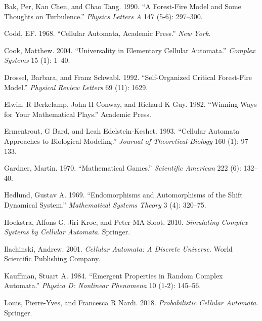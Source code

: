 \documentclass[
]{book}
\newlength{\cslhangindent}
\newenvironment{cslreferences}%
  {\setlength{\parindent}{0pt}%
  \everypar{\setlength{\hangindent}{\cslhangindent}}\ignorespaces}%
  {\par}
\begin{document}
\hypertarget{refs}{}
\begin{cslreferences}
\leavevmode\hypertarget{ref-bak1990forest}{}%
Bak, Per, Kan Chen, and Chao Tang. 1990. ``A Forest-Fire Model and Some Thoughts on Turbulence.'' \emph{Physics Letters A} 147 (5-6): 297--300.

\leavevmode\hypertarget{ref-codd1968cellular}{}%
Codd, EF. 1968. ``Cellular Automata, Academic Press.'' \emph{New York}.

\leavevmode\hypertarget{ref-cook2004universality}{}%
Cook, Matthew. 2004. ``Universality in Elementary Cellular Automata.'' \emph{Complex Systems} 15 (1): 1--40.

\leavevmode\hypertarget{ref-drossel1992self}{}%
Drossel, Barbara, and Franz Schwabl. 1992. ``Self-Organized Critical Forest-Fire Model.'' \emph{Physical Review Letters} 69 (11): 1629.

\leavevmode\hypertarget{ref-elwin1982winning}{}%
Elwin, R Berkelamp, John H Conway, and Richard K Guy. 1982. ``Winning Ways for Your Mathematical Plays.'' Academic Press.

\leavevmode\hypertarget{ref-ermentrout1993cellular}{}%
Ermentrout, G Bard, and Leah Edelstein-Keshet. 1993. ``Cellular Automata Approaches to Biological Modeling.'' \emph{Journal of Theoretical Biology} 160 (1): 97--133.

\leavevmode\hypertarget{ref-gardner1970mathematical}{}%
Gardner, Martin. 1970. ``Mathematical Games.'' \emph{Scientific American} 222 (6): 132--40.

\leavevmode\hypertarget{ref-hedlund1969endomorphisms}{}%
Hedlund, Gustav A. 1969. ``Endomorphisms and Automorphisms of the Shift Dynamical System.'' \emph{Mathematical Systems Theory} 3 (4): 320--75.

\leavevmode\hypertarget{ref-hoekstra2010simulating}{}%
Hoekstra, Alfons G, Jiri Kroc, and Peter MA Sloot. 2010. \emph{Simulating Complex Systems by Cellular Automata}. Springer.

\leavevmode\hypertarget{ref-ilachinski2001cellular}{}%
Ilachinski, Andrew. 2001. \emph{Cellular Automata: A Discrete Universe}. World Scientific Publishing Company.

\leavevmode\hypertarget{ref-kauffman1984emergent}{}%
Kauffman, Stuart A. 1984. ``Emergent Properties in Random Complex Automata.'' \emph{Physica D: Nonlinear Phenomena} 10 (1-2): 145--56.

\leavevmode\hypertarget{ref-louis2018probabilistic}{}%
Louis, Pierre-Yves, and Francesca R Nardi. 2018. \emph{Probabilistic Cellular Automata}. Springer.


\end{cslreferences}
\end{document}
